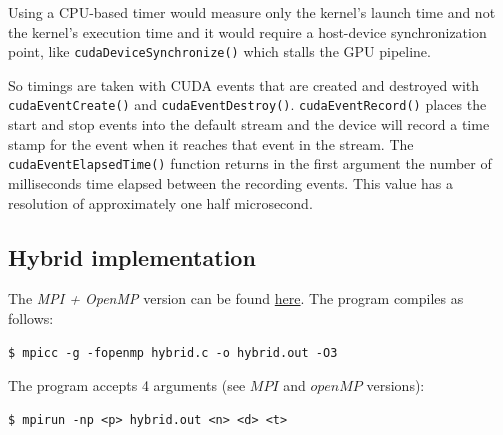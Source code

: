 Using a CPU-based timer would measure only the kernel's launch time and not the kernel's execution time and it would require a host-device synchronization point, like \texttt{cudaDeviceSynchronize()} which stalls the GPU pipeline.

So timings are taken with CUDA events that are created and destroyed with \texttt{cudaEventCreate()} and \texttt{cudaEventDestroy()}. \texttt{cudaEventRecord()} places the start and stop events into the default stream  and the device will record a time stamp for the event when it reaches that event in the stream. 
The \texttt{cudaEventElapsedTime()} function returns in the first argument the number of milliseconds time elapsed between the recording events. This value has a resolution of approximately one half microsecond.




\subsection{Hybrid implementation}\label{hybimpl}
The \emph{MPI + OpenMP} version can be found \href{https://github.com/firaja/Parallel-FloydWarshall/blob/master/hybrid.c}{here}. 
The program compiles as follows:
\begin{lstlisting}[basicstyle=\footnotesize\ttfamily]
$ mpicc -g -fopenmp hybrid.c -o hybrid.out -O3
\end{lstlisting}
The program accepts 4 arguments (see $MPI$ and $openMP$ versions):
\begin{lstlisting}[basicstyle=\footnotesize\ttfamily]
$ mpirun -np <p> hybrid.out <n> <d> <t>
\end{lstlisting}

